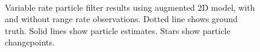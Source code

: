 \documentclass[conference]{IEEEtran}
\begin{document}
%
\begin{figure}[!t]
\centering
{}
\\
\caption{Variable rate particle filter results using augmented 2D model, with and without range rate observations. Dotted line shows ground truth. Solid lines show particle estimates. Stars show particle changepoints.}
\label{fig:2D_Model2}
\end{figure}
\end{document}
